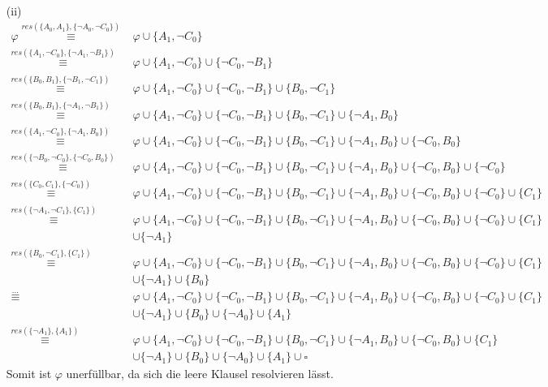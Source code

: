 \documentclass[a4paper,10pt]{article}
\begin{document}
\begin{enumerate}
\begin{enumerate}[1.]
\begin{enumerate}
				\end{enumerate}
		\end{enumerate}
	\item[(ii)]
	\begin{align*}
		\varphi \overset{res(\{ A_0,A_1\},\{ \neg A_0,\neg C_0\})}{\equiv} &\varphi \cup \{ A_1,\neg C_0 \} \\
		\overset{res(\{ A_1,\neg C_0 \},\{ \neg A_1,\neg B_1\})}{\equiv} &\varphi \cup \{ A_1,\neg C_0 \} \cup \{ \neg C_0, \neg B_1\}\\
		\overset{res(\{ B_0, B_1 \},\{ \neg B_1,\neg C_1\})}{\equiv} &\varphi \cup \{ A_1,\neg C_0 \} \cup \{ \neg C_0, \neg B_1\} \cup \{ B_0, \neg C_1\}\\
		\overset{res(\{ B_0, B_1 \},\{ \neg A_1,\neg B_1\})}{\equiv} &\varphi \cup \{ A_1,\neg C_0 \} \cup \{ \neg C_0, \neg B_1\} \cup \{ B_0, \neg C_1\} \cup \{\neg A_1, B_0\}\\
		\overset{res(\{ A_1,\neg C_0 \},\{\neg A_1, B_0\})}{\equiv} &\varphi \cup \{ A_1,\neg C_0 \} \cup \{ \neg C_0, \neg B_1\} \cup \{ B_0, \neg C_1\} \cup \{\neg A_1, B_0\} \cup \{\neg C_0, B_0 \}\\
		\overset{res(\{ \neg B_0,\neg C_0 \},\{\neg C_0, B_0\})}{\equiv} &\varphi \cup \{ A_1,\neg C_0 \} \cup \{ \neg C_0, \neg B_1\} \cup \{ B_0, \neg C_1\} \cup \{\neg A_1, B_0\} \cup \{\neg C_0, B_0 \} \cup \{\neg C_0\}\\
		\overset{res(\{ C_0, C_1 \},\{\neg C_0\})}{\equiv} &\varphi \cup \{ A_1,\neg C_0 \} \cup \{ \neg C_0, \neg B_1\} \cup \{ B_0, \neg C_1\} \cup \{\neg A_1, B_0\} \cup \{\neg C_0, B_0 \} \cup \{\neg C_0\} \cup \{C_1\}\\
		\overset{res(\{ \neg A_1, \neg C_1 \},\{C_1\})}{\equiv} &\varphi \cup \{ A_1,\neg C_0 \} \cup \{ \neg C_0, \neg B_1\} \cup \{ B_0, \neg C_1\} \cup \{\neg A_1, B_0\} \cup \{\neg C_0, B_0 \} \cup \{\neg C_0\} \cup \{C_1\} \\
		&\cup \{ \neg A_1 \}\\
		\overset{res(\{ B_0, \neg C_1 \},\{C_1\})}{\equiv} &\varphi \cup \{ A_1,\neg C_0 \} \cup \{ \neg C_0, \neg B_1\} \cup \{ B_0, \neg C_1\} \cup \{\neg A_1, B_0\} \cup \{\neg C_0, B_0 \} \cup \{\neg C_0\} \cup \{C_1\} \\
		&\cup \{ \neg A_1 \} \cup \{ B_0 \}\\
		\overset{...}{\equiv} &\varphi \cup \{ A_1,\neg C_0 \} \cup \{ \neg C_0, \neg B_1\} \cup \{ B_0, \neg C_1\} \cup \{\neg A_1, B_0\} \cup \{\neg C_0, B_0 \} \cup \{\neg C_0\} \cup \{C_1\} \\
		&\cup \{ \neg A_1 \} \cup \{ B_0 \} \cup \{\neg A_0\} \cup \{A_1\} \\
		\overset{res(\{\neg A_1\},\{ A_1 \})}{\equiv} &\varphi \cup \{ A_1,\neg C_0 \} \cup \{ \neg C_0, \neg B_1\} \cup \{ B_0, \neg C_1\} \cup \{\neg A_1, B_0\} \cup \{\neg C_0, B_0 \} \cup \{C_1\} \\
		&\cup \{ \neg A_1 \} \cup \{ B_0 \} \cup \{\neg A_0\} \cup \{A_1\} \cup \square
	\end{align*}
	Somit ist $\varphi$ unerfüllbar, da sich die leere Klausel resolvieren lässt.

	\end{enumerate}
\end{document}
